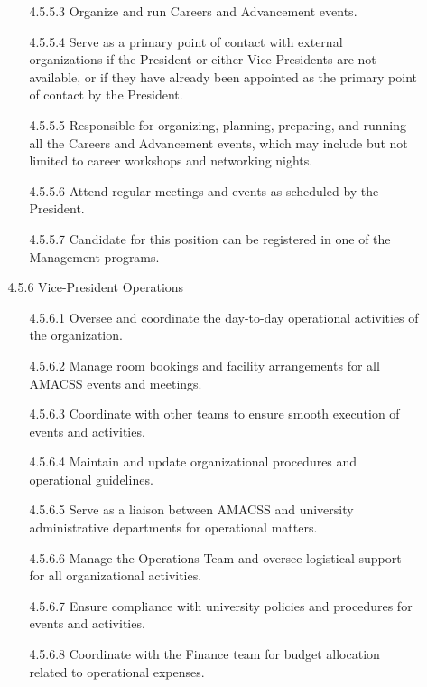 \documentclass[12pt,a4paper]{article}
\begin{document}
\begin{enumerate}
\begin{enumerate}
\begin{enumerate}
\item[4.5.5.3] Organize and run Careers and Advancement events.

\item[4.5.5.4] Serve as a primary point of contact with external organizations if the President or either Vice-Presidents are not available, or if they have already been appointed as the primary point of contact by the President.

\item[4.5.5.5] Responsible for organizing, planning, preparing, and running all the Careers and Advancement events, which may include but not limited to career workshops and networking nights.

\item[4.5.5.6] Attend regular meetings and events as scheduled by the President.

\item[4.5.5.7] Candidate for this position can be registered in one of the Management programs.
\end{enumerate}

\item[4.5.6] Vice-President Operations

\begin{enumerate}
\item[4.5.6.1] Oversee and coordinate the day-to-day operational activities of the organization.

\item[4.5.6.2] Manage room bookings and facility arrangements for all AMACSS events and meetings.

\item[4.5.6.3] Coordinate with other teams to ensure smooth execution of events and activities.

\item[4.5.6.4] Maintain and update organizational procedures and operational guidelines.

\item[4.5.6.5] Serve as a liaison between AMACSS and university administrative departments for operational matters.

\item[4.5.6.6] Manage the Operations Team and oversee logistical support for all organizational activities.

\item[4.5.6.7] Ensure compliance with university policies and procedures for events and activities.

\item[4.5.6.8] Coordinate with the Finance team for budget allocation related to operational expenses.
\end{enumerate}


\end{enumerate}
\end{enumerate}
\end{document}

